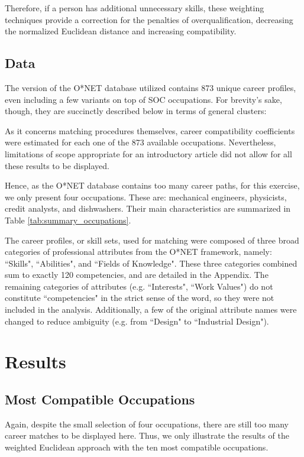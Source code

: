 \documentclass{article}
\begin{document}
Therefore, if a person has additional unnecessary skills, these weighting techniques provide a correction for the penalties of overqualification, decreasing the normalized Euclidean distance and increasing compatibility.

\subsection{Data}
The version of the O*NET database utilized contains 873 unique career profiles, even including a few variants on top of SOC occupations. For brevity's sake, though, they are succinctly described below in terms of general clusters:
\GeneralOccupationalStatistics

As it concerns matching procedures themselves, career compatibility coefficients were estimated for each one of the 873 available occupations. Nevertheless, limitations of scope appropriate for an introductory article did not allow for all these results to be displayed. 

Hence, as the O*NET database contains too many career paths, for this exercise, we only present four occupations. These are: mechanical engineers, physicists, credit analysts, and dishwashers. Their main characteristics are summarized in Table \ref{tab:summary_occupations}.
\SummaryOccupations

The career profiles, or skill sets, used for matching were composed of three broad categories of professional attributes from the O*NET framework, namely: ``Skills", ``Abilities", and ``Fields of Knowledge". These three categories combined sum to exactly 120 competencies, and are detailed in the Appendix. The remaining categories of attributes (e.g. ``Interests", ``Work Values") do not constitute ``competencies" in the strict sense of the word, so they were not included in the analysis. Additionally, a few of the original attribute names were changed to reduce ambiguity (e.g. from ``Design" to ``Industrial Design").

\section{Results}

\subsection{Most Compatible Occupations}
Again, despite the small selection of four occupations, there are still too many career matches to be displayed here. Thus, we only illustrate the results of the weighted Euclidean approach with the ten most compatible occupations.
\MatchesEngineers
\MatchesPhysicists
\MatchesCreditAnalysts
\MatchesDishwashers
\end{document}
